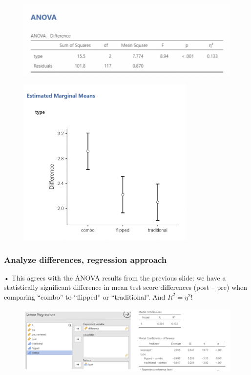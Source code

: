 \documentclass[
  letterpaper,
  DIV=11,
  numbers=noendperiod]{scrreprt}
\begin{document}
\begin{figure}

{\centering \includegraphics[width=4.5625in,height=\textheight]{images/Mod5_28.png}

}

\end{figure}

\begin{figure}

{\centering \includegraphics[width=3.46875in,height=\textheight]{images/Mod5_29.png}

}

\end{figure}

\hypertarget{analyze-differences-regression-approach}{%
\subsubsection{Analyze differences, regression
approach}\label{analyze-differences-regression-approach}}

• This agrees with the ANOVA results from the previous slide: we have a
statistically significant difference in mean test score differences
(post -- pre) when comparing ``combo'' to ``flipped'' or
``traditional''. And \(R^2 = \eta^2\)!

\begin{figure}

{\centering \includegraphics{images/Mod5_30.png}

}

\end{figure}
\end{document}
